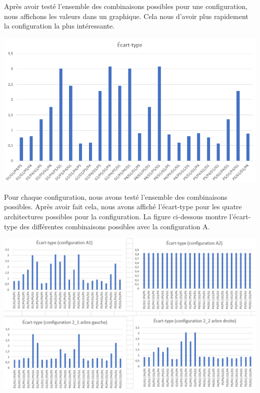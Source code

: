 \documentclass{config}
\begin{document}
\begin{spacing}{1.2}
Après avoir testé l'ensemble des combinaisons possibles pour une configuration, nous affichons les valeurs dans un graphique. Cela nous d'avoir plus rapidement la configuration la plus intéressante.

\begin{center}
\includegraphics[scale=0.8]{graphique_ecart_type.PNG}
\end{center}

Pour chaque configuration, nous avons testé l'ensemble des combinaisons possibles. Après avoir fait cela, nous avons affiché l'écart-type pour les quatre architectures possibles pour la configuration. La figure ci-dessous montre l'écart-type des différentes combinaisons possibles avec la configuration A.

\begin{center}
\includegraphics[scale=0.75]{graphique_ecart_type_configurationA.PNG}
\end{center}


\end{spacing}
\end{document}
